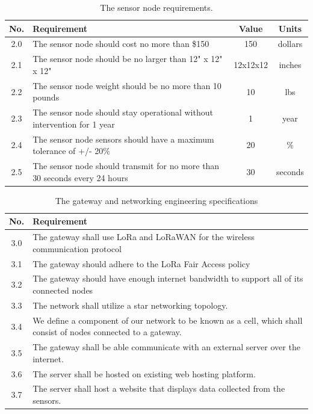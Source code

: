 \begin{table}[H]
\centering
\caption{The sensor node requirements.}
\begin{tabularx}{\linewidth}{|c|X|c|c|}
\hline
No. & Requirement & Value & Units \\
\hline\hline
2.0 & The sensor node should cost no more than \$150 & 150 & dollars \\\hline
2.1 & The sensor node should be no larger than 12" x 12" x 12" & 12x12x12 & inches \\\hline
2.2 & The sensor node weight should be no more than 10 pounds & 10 & lbs \\\hline
2.3 & The sensor node should stay operational without intervention for 1 year & 1 & year \\\hline
2.4 & The sensor node sensors should have a maximum tolerance of +/- 20\% & 20 & \% \\\hline
2.5 & The sensor node should transmit for no more than 30 seconds every 24 hours & 30 & seconds \\\hline
\end{tabularx}
\label{tab:nodeRequirements}
\end{table}

\begin{table}[H]
\centering
\caption{The gateway and networking engineering specifications}
\begin{tabularx}{\linewidth}{|c|X|}
\hline
No. & Requirement \\
\hline\hline
3.0 & The gateway shall use LoRa and LoRaWAN for the wireless communication protocol \\\hline
3.1 & The gateway should adhere to the LoRa Fair Access policy \\\hline
3.2 & The gateway should have enough internet bandwidth to support all of its connected nodes \\\hline
3.3 & The network shall utilize a star networking topology.\\\hline
3.4 & We define a component of our network to be known as a cell, which shall consist of nodes connected to a gateway. \\\hline
3.5 & The gateway shall be able communicate with an external server over the internet.\\\hline
3.6 & The server shall be hosted on existing web hosting platform.\\\hline
3.7 & The server shall host a website that displays data collected from the sensors.\\\hline
\end{tabularx}
\label{tab:networkingSpecs}
\end{table}

